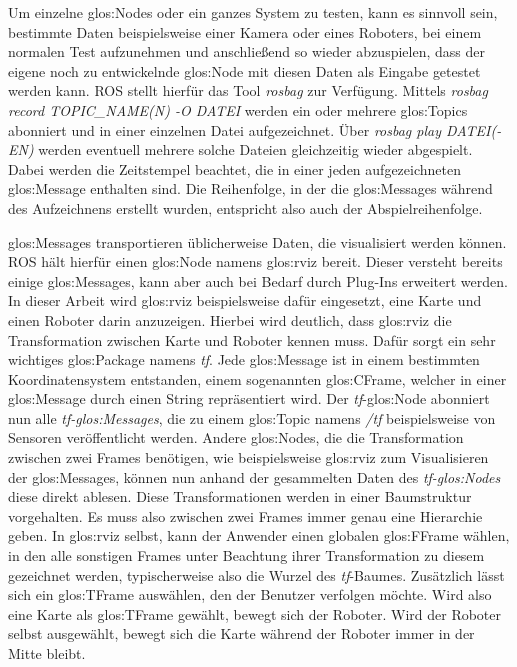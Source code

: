 Um einzelne \glspl{glos:Node} oder ein ganzes System zu testen, kann es sinnvoll sein, bestimmte Daten beispielsweise einer Kamera oder eines Roboters, bei einem normalen Test aufzunehmen und anschließend so wieder abzuspielen, dass der eigene noch zu entwickelnde \gls{glos:Node} mit diesen Daten als Eingabe getestet werden kann. \gls{ROS} stellt hierfür das Tool \emph{rosbag} zur Verfügung. Mittels \emph{rosbag record TOPIC\_NAME(N) -O DATEI} werden ein oder mehrere \glspl{glos:Topic} abonniert und in einer einzelnen Datei aufgezeichnet. Über \emph{rosbag play DATEI(-EN)} werden eventuell mehrere solche Dateien gleichzeitig wieder abgespielt. Dabei werden die Zeitstempel beachtet, die in einer jeden aufgezeichneten \gls{glos:Message} enthalten sind. Die Reihenfolge, in der die \glspl{glos:Message} während des Aufzeichnens erstellt wurden, entspricht also auch der Abspielreihenfolge.

\glspl{glos:Message} transportieren üblicherweise Daten, die visualisiert werden können. \gls{ROS} hält hierfür einen \gls{glos:Node} namens \gls{glos:rviz} bereit. Dieser versteht bereits einige \glspl{glos:Message}, kann aber auch bei Bedarf durch Plug-Ins erweitert werden. In dieser Arbeit wird \gls{glos:rviz} beispielsweise dafür eingesetzt, eine Karte und einen Roboter darin anzuzeigen. Hierbei wird deutlich, dass \gls{glos:rviz} die Transformation zwischen Karte und Roboter kennen muss. Dafür sorgt ein sehr wichtiges \gls{glos:Package} namens \emph{tf}. Jede \gls{glos:Message} ist in einem bestimmten Koordinatensystem entstanden, einem sogenannten \gls{glos:CFrame}, welcher in einer \gls{glos:Message} durch einen String repräsentiert wird. Der \emph{tf}-\gls{glos:Node} abonniert nun alle \emph{tf-\glspl{glos:Message}}, die zu einem \gls{glos:Topic} namens \emph{/tf} beispielsweise von Sensoren veröffentlicht werden. Andere \glspl{glos:Node}, die die Transformation zwischen zwei \glspl{Frame} benötigen, wie beispielsweise \gls{glos:rviz} zum Visualisieren der \glspl{glos:Message}, können nun anhand der gesammelten Daten des \emph{tf-\glspl{glos:Node}} diese direkt ablesen. Diese Transformationen werden in einer Baumstruktur vorgehalten. Es muss also zwischen zwei \glspl{Frame} immer genau eine Hierarchie geben. In \gls{glos:rviz} selbst, kann der Anwender einen globalen \gls{glos:FFrame} wählen, in den alle sonstigen \glspl{Frame} unter Beachtung ihrer Transformation zu diesem gezeichnet werden, typischerweise also die Wurzel des \emph{tf}-Baumes. Zusätzlich lässt sich ein \gls{glos:TFrame} auswählen, den der Benutzer verfolgen möchte. Wird also eine Karte als \gls{glos:TFrame} gewählt, bewegt sich der Roboter. Wird der Roboter selbst ausgewählt, bewegt sich die Karte während der Roboter immer in der Mitte bleibt.

